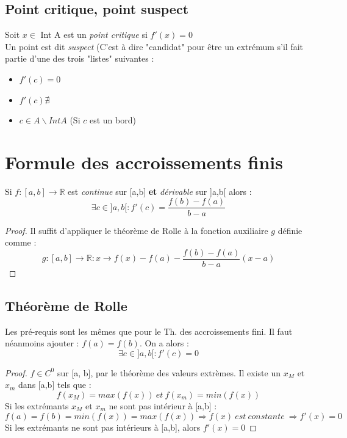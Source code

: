\documentclass	[11pt, a4paper, openany]{book}
\begin{document}
\subsection{Point critique, point suspect}
Soit $x \in$ Int A est un \textit{point critique} si $f'(x) = 0$\\
Un point est dit \textit{suspect} (C'est à dire "candidat" pour être un extrémum s'il fait partie d'une des trois "listes" suivantes :
\begin{itemize}
\item $f'(c) = 0$
\item $f'(c) \nexists$
\item $c \in A\backslash Int A$ (Si $c$ est un bord)
\end{itemize}

\section{Formule des accroissements finis}
Si $f: [a,b] \rightarrow \mathbb{R}$ est \textit{continue} sur [a,b] \textbf{et} \textit{dérivable} sur ]a,b[ alors : \\
$$\exists c \in ]a,b[ : f'(c) = \frac{f(b)-f(a)}{b-a}$$
\begin{proof}
Il suffit d'appliquer le théorème de Rolle à la fonction auxiliaire $g$ définie comme : 
$$g : [a,b] \rightarrow \mathbb{R} : x \rightarrow f(x) - f(a) - \frac{f(b) - f(a)}{b-a}(x-a)$$
\end{proof}

\subsection{Théorème de Rolle}
Les pré-requis sont les mêmes que pour le Th. des accroissements fini. Il faut néanmoins ajouter : $f(a) = f(b)$. On a alors :
$$\exists c \in ]a,b[ : f'(c) = 0 $$
\begin{proof}
$f \in C^{0}$ sur [a, b], par le théorème des valeurs extrèmes. Il existe un $x_{M}$ et $x_{m}$  dans [a,b] tels que : 
$$f(x_{M}) = max(f(x))\ et\ f(x_{m}) = min(f(x))$$
Si les extrémants $x_{M}$ et $x_{m}$ ne sont pas intérieur à [a,b] :
$$f(a) = f(b) = min(f(x)) = max(f(x)) \Rightarrow f(x)\ est\ constante\  \Rightarrow f'(x) = 0$$
Si les extrémants ne sont pas intérieurs à [a,b], alors $f'(x) = 0$
\end{proof}
\end{document}
